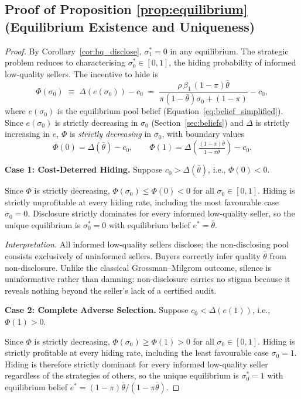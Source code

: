 \documentclass[10pt,letterpaper]{bp-template-concise}
\begin{document}
\subsection*{Proof of Proposition \ref{prop:equilibrium} (Equilibrium Existence and Uniqueness)}

\begin{proof}
By Corollary~\ref{cor:hq_disclose}, $\sigma_1^* = 0$ in any equilibrium. The strategic problem reduces to characterising $\sigma_0^* \in [0,1]$, the hiding probability of informed low-quality sellers. The incentive to hide is
\[
    \Phi(\sigma_0) \;\equiv\; \Delta\!\left(e(\sigma_0)\right) - c_0
    \;=\; \frac{\rho\,\beta_1\,(1-\pi)\bar{\theta}}{\pi(1-\bar{\theta})\sigma_0 + (1-\pi)} - c_0,
\]
where $e(\sigma_0)$ is the equilibrium pool belief (Equation~\eqref{eq:belief_simplified}). Since $e(\sigma_0)$ is strictly decreasing in $\sigma_0$ (Section~\ref{sec:beliefs}) and $\Delta$ is strictly increasing in $e$, $\Phi$ is \emph{strictly decreasing} in $\sigma_0$, with boundary values
\[
    \Phi(0) = \Delta(\bar{\theta}) - c_0, \qquad
    \Phi(1) = \Delta\!\left(\tfrac{(1-\pi)\bar{\theta}}{1-\pi\bar{\theta}}\right) - c_0.
\]

\medskip
\textbf{Case 1: Cost-Deterred Hiding.} Suppose $c_0 > \Delta(\bar{\theta})$, i.e., $\Phi(0) < 0$.

Since $\Phi$ is strictly decreasing, $\Phi(\sigma_0) \leq \Phi(0) < 0$ for all $\sigma_0 \in [0,1]$. Hiding is strictly unprofitable at every hiding rate, including the most favourable case $\sigma_0 = 0$. Disclosure strictly dominates for every informed low-quality seller, so the unique equilibrium is $\sigma_0^* = 0$ with equilibrium belief $e^* = \bar{\theta}$.

\textit{Interpretation.} All informed low-quality sellers disclose; the non-disclosing pool consists exclusively of uninformed sellers. Buyers correctly infer quality $\bar{\theta}$ from non-disclosure. Unlike the classical Grossman--Milgrom outcome, silence is uninformative rather than damning: non-disclosure carries no stigma because it reveals nothing beyond the seller's lack of a certified audit.

\medskip
\textbf{Case 2: Complete Adverse Selection.} Suppose $c_0 < \Delta(e(1))$, i.e., $\Phi(1) > 0$.

Since $\Phi$ is strictly decreasing, $\Phi(\sigma_0) \geq \Phi(1) > 0$ for all $\sigma_0 \in [0,1]$. Hiding is strictly profitable at every hiding rate, including the least favourable case $\sigma_0 = 1$. Hiding is therefore strictly dominant for every informed low-quality seller regardless of the strategies of others, so the unique equilibrium is $\sigma_0^* = 1$ with equilibrium belief $e^* = (1-\pi)\bar{\theta}/(1-\pi\bar{\theta})$.


\end{proof}
\end{document}
